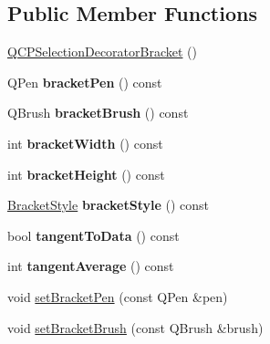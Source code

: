 \subsection*{Public Member Functions}
\begin{DoxyCompactItemize}
\item 
\hyperlink{classQCPSelectionDecoratorBracket_ad2cfbff98cc055311810ba357f6eef1b}{Q\+C\+P\+Selection\+Decorator\+Bracket} ()
\item 
\mbox{\label{classQCPSelectionDecoratorBracket_a841c56a37380f2e8af6126881b5f0fb9}} 
Q\+Pen {\bfseries bracket\+Pen} () const
\item 
\mbox{\label{classQCPSelectionDecoratorBracket_ac5e409d6b62f0b71143fb8a526fe59a9}} 
Q\+Brush {\bfseries bracket\+Brush} () const
\item 
\mbox{\label{classQCPSelectionDecoratorBracket_ae268c621b808d8660d38fc6c69fc40ae}} 
int {\bfseries bracket\+Width} () const
\item 
\mbox{\label{classQCPSelectionDecoratorBracket_a531d9c953a7279db93611248e115edab}} 
int {\bfseries bracket\+Height} () const
\item 
\mbox{\label{classQCPSelectionDecoratorBracket_a1c3d65e560555caf9b31123008491ac6}} 
\hyperlink{classQCPSelectionDecoratorBracket_aa6d18517ec0553575bbef0de4252336e}{Bracket\+Style} {\bfseries bracket\+Style} () const
\item 
\mbox{\label{classQCPSelectionDecoratorBracket_a257cb5f8b822edc839c1510ed0f23f13}} 
bool {\bfseries tangent\+To\+Data} () const
\item 
\mbox{\label{classQCPSelectionDecoratorBracket_a4e21ee2db0f43c1208d2e30879ec6a3c}} 
int {\bfseries tangent\+Average} () const
\item 
void \hyperlink{classQCPSelectionDecoratorBracket_ac0e392a6097990f8aa978932a8fa05d6}{set\+Bracket\+Pen} (const Q\+Pen \&pen)
\item 
void \hyperlink{classQCPSelectionDecoratorBracket_a2f4ea0bfb0ea980252b76dd349dd53aa}{set\+Bracket\+Brush} (const Q\+Brush \&brush)

\end{DoxyCompactItemize}
